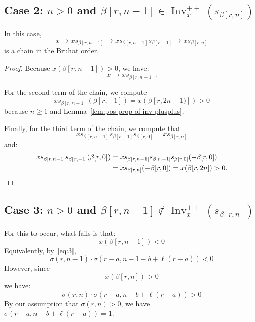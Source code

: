 \documentclass[ALCO,ThmDefs,Unicode]{cedram}
\DeclareMathOperator{\Inv}{Inv}
\newcommand{\Invplusplusx}{\Inv^{++}_x}
\begin{document}
\subsection{Case 2: \texorpdfstring{$n > 0$}{n > 0} and \texorpdfstring{$ \beta[r,n-1] \in \Invplusplusx(s_{\beta[r,n]})$}{beta[r,n-1] in Invplusplusx(s beta[r,n])}}

In this case,
\begin{equation}\label{eq:49}
x \rightarrow x s_{\beta[r,n-1]} \rightarrow x s_{\beta[r,n-1]}s_{\beta[r,-1]} \rightarrow x s_{\beta[r,n]}
\end{equation}
is a chain in the Bruhat order.

\begin{proof}
Because $x(\beta[r,n-1])>0$, we have:
\begin{equation}\label{eq:52}
x \rightarrow x s_{\beta[r,n-1]}.
\end{equation}

For the second term of the chain, we compute
\begin{equation}\label{eq:53}
x s_{\beta[r,n-1]}(\beta[r,-1]) = x(\beta[r,2n-1)]) > 0
\end{equation}
because $n \geq 1$ and Lemma~\ref{lem:pos-prop-of-inv-plusplus}.

Finally, for the third term of the chain, we compute that
\begin{equation}\label{eq:54}
x s_{\beta[r,n-1]}s_{\beta[r,-1]}s_{\beta[r,0]} = x s_{\beta[r,n]}
\end{equation}
and:
\begin{align}\label{eq:56}
x s_{\beta[r,n-1]}s_{\beta[r,-1]}(\beta[r,0]) &= x s_{\beta[r,n-1]}s_{\beta[r,-1]}s_{\beta[r,0]}(- \beta[r,0])\\
&= xs_{\beta[r,n]}(- \beta[r,0]) = x(\beta[r,2n]) > 0.\notag\qedhere
\end{align}
\end{proof}

\subsection{Case 3: \texorpdfstring{$n > 0$}{n > 0} and \texorpdfstring{$ \beta[r,n-1] \notin \Invplusplusx(s_{\beta[r,n]})$}{beta[r,n-1] notin Invplusplusx(s beta[r,n])}}

For this to occur, what fails is that:
\begin{equation}\label{eq:41}
x(\beta[r,n-1]) < 0
\end{equation}
Equivalently, by~\eqref{eq:3},
\begin{equation}\label{eq:40}
\sigma(r,n-1) \cdot \sigma(r-a,n-1-b+\ell(r-a)) < 0
\end{equation}
However, since
\begin{equation}\label{eq:42}
x(\beta[r,n]) > 0
\end{equation}
we have:
\begin{equation}\label{eq:43}
\sigma(r,n) \cdot \sigma(r-a,n-b+\ell(r-a)) > 0
\end{equation}
By our assumption that $\sigma(r,n) > 0$, we have $\sigma(r-a,n-b+\ell(r-a)) = 1$.
\end{document}
